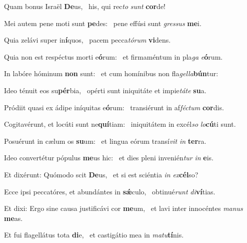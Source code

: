 \item Quam bonus Israël \textbf{De}us,~\psstar{} his, qui rec\textit{to} \textit{sunt} \textbf{cor}de!

\item Mei autem pene moti sunt \textbf{pe}des:~\psstar{} pene effúsi sunt \textit{gressus} \textbf{me}i.

\item Quia zelávi super in\textbf{í}quos,~\psstar{} pacem pecca\textit{tórum} \textbf{vi}dens.

\item Quia non est respéctus morti e\textbf{ó}rum:~\psstar{} et firmaméntum in pla\textit{ga} \textit{e}\textbf{ó}rum.

\item In labóre hóminum \textbf{non} sunt:~\psstar{} et cum homínibus non fla\textit{gella}\textbf{bún}tur:

\item Ideo ténuit eos su\textbf{pér}bia,~\psstar{} opérti sunt iniquitáte et impie\textit{táte} \textbf{su}a.

\item Pródiit quasi ex ádipe iníquitas e\textbf{ó}rum:~\psstar{} transiérunt in af\textit{féctum} \textbf{cor}dis.

\item Cogitavérunt, et locúti sunt ne\textbf{quí}tiam:~\psstar{} iniquitátem in excél\textit{so} \textit{lo}\textbf{cú}ti sunt.

\item Posuérunt in cælum os \textbf{su}um:~\psstar{} et lingua eórum transí\textit{vit} \textit{in} \textbf{ter}ra.

\item Ideo convertétur pópulus \textbf{me}us hic:~\psstar{} et dies pleni invenién\textit{tur} \textit{in} \textbf{e}is.

\item Et dixérunt: Quómodo scit \textbf{De}us,~\psstar{} et si est sciéntia \textit{in} \textit{ex}\textbf{cél}so?

\item Ecce ipsi peccatóres, et abundántes in \textbf{sǽ}culo,~\psstar{} obtinué\textit{runt} \textit{di}\textbf{ví}tias.

\item Et dixi: Ergo sine causa justificávi cor \textbf{me}um,~\psstar{} et lavi inter innocéntes \textit{manus} \textbf{me}as.

\item Et fui flagellátus tota \textbf{di}e,~\psstar{} et castigátio mea in \textit{matu}\textbf{tí}nis.

